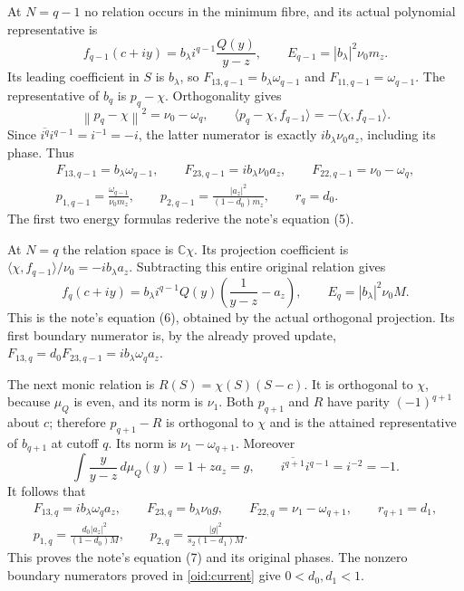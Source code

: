 \documentclass[11pt,a4paper]{article}
\newcommand{\C}{\mathbb C}
\newcommand{\norm}[1]{\left\lVert#1\right\rVert}
\begin{document}
At $N=q-1$ no relation occurs in the minimum fibre, and its actual
polynomial representative is
\[
 f_{q-1}(c+iy)=b_\lambda i^{q-1}\frac{Q(y)}{y-z},\qquad
 E_{q-1}=|b_\lambda|^2\nu_0m_z.
\]
Its leading coefficient in $S$ is $b_\lambda$, so
$F_{13,q-1}=b_\lambda\omega_{q-1}$ and
$F_{11,q-1}=\omega_{q-1}$. The representative of $b_q$ is
$p_q-\chi$. Orthogonality gives
\[
 \norm{p_q-\chi}^2=\nu_0-\omega_q,
 \qquad
 \langle p_q-\chi,f_{q-1}\rangle=-\langle\chi,f_{q-1}\rangle.
\]
Since $\overline{i^q}i^{q-1}=i^{-1}=-i$, the latter numerator is
exactly $i b_\lambda\nu_0a_z$, including its phase. Thus
\begin{equation}\label{oid:lowfirst}
 \begin{gathered}
 F_{13,q-1}=b_\lambda\omega_{q-1},\qquad
 F_{23,q-1}=i b_\lambda\nu_0a_z,\qquad
 F_{22,q-1}=\nu_0-\omega_q,\\
 p_{1,q-1}=\frac{\omega_{q-1}}{\nu_0m_z},\qquad
 p_{2,q-1}=\frac{|a_z|^2}{(1-d_0)m_z},\qquad
 r_q=d_0.
 \end{gathered}
\end{equation}
The first two energy formulas rederive the note's equation (5).

At $N=q$ the relation space is $\C\chi$.
Its projection coefficient is
$\langle\chi,f_{q-1}\rangle/\nu_0=-i b_\lambda a_z$.
Subtracting this entire original relation gives
\begin{equation}\label{oid:lowsecondlift}
 f_q(c+iy)=b_\lambda i^{q-1}Q(y)
 \left(\frac1{y-z}-a_z\right),\qquad
 E_q=|b_\lambda|^2\nu_0M.
\end{equation}
This is the note's equation (6), obtained by the actual orthogonal
projection. Its first boundary numerator is, by the already proved
update, $F_{13,q}=d_0F_{23,q-1}=i b_\lambda\omega_q a_z$.

The next monic relation is $R(S)=\chi(S)(S-c)$.
It is orthogonal to $\chi$, because $\mu_Q$ is even, and its norm
is $\nu_1$. Both $p_{q+1}$ and $R$ have parity $(-1)^{q+1}$
about $c$; therefore $p_{q+1}-R$ is orthogonal to $\chi$ and is
the attained representative of $b_{q+1}$ at cutoff $q$.
Its norm is $\nu_1-\omega_{q+1}$. Moreover
\[
 \int\frac{y}{y-z}\,d\mu_Q(y)=1+za_z=g,\qquad
 \overline{i^{q+1}}i^{q-1}=i^{-2}=-1.
\]
It follows that
\begin{equation}\label{oid:lowsecond}
\begin{gathered}
 F_{13,q}=i b_\lambda\omega_q a_z,\qquad
 F_{23,q}=b_\lambda\nu_0g,\qquad
 F_{22,q}=\nu_1-\omega_{q+1},\qquad r_{q+1}=d_1,\\
 p_{1,q}=\frac{d_0|a_z|^2}{(1-d_0)M},\qquad
 p_{2,q}=\frac{|g|^2}{s_2(1-d_1)M}.
\end{gathered}
\end{equation}
This proves the note's equation (7) and its original phases. The
nonzero boundary numerators proved in \eqref{oid:current} give
$0<d_0,d_1<1$.
\end{document}
